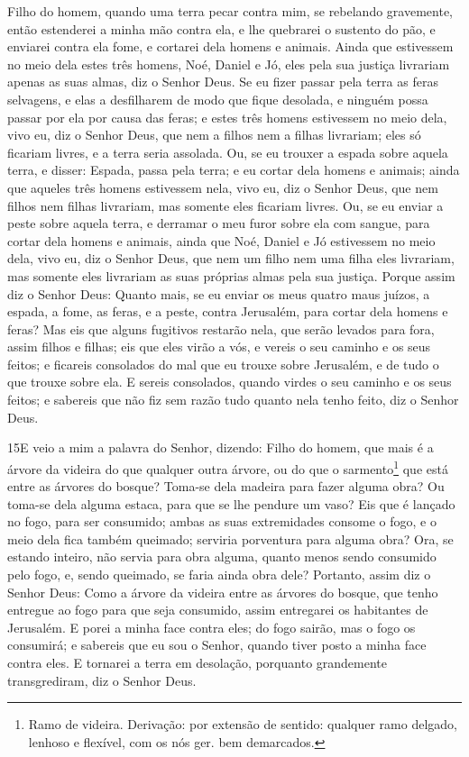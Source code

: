 Filho do homem, quando uma terra pecar contra mim, se rebelando
gravemente, então estenderei a minha mão contra ela, e lhe quebrarei
o sustento do pão, e enviarei contra ela fome, e cortarei dela
homens e animais. Ainda que estivessem no meio dela estes
três homens, Noé, Daniel e Jó, eles pela sua justiça livrariam
apenas as suas almas, diz o Senhor Deus. Se eu fizer passar
pela terra as feras selvagens, e elas a desfilharem de modo que
fique desolada, e ninguém possa passar por ela por causa das feras;
e estes três homens estivessem no meio dela, vivo eu, diz o
Senhor Deus, que nem a filhos nem a filhas livrariam; eles só
ficariam livres, e a terra seria assolada. Ou, se eu trouxer
a espada sobre aquela terra, e disser: Espada, passa pela terra; e
eu cortar dela homens e animais; ainda que aqueles três
homens estivessem nela, vivo eu, diz o Senhor Deus, que nem filhos
nem filhas livrariam, mas somente eles ficariam livres. Ou,
se eu enviar a peste sobre aquela terra, e derramar o meu furor
sobre ela com sangue, para cortar dela homens e animais,
ainda que Noé, Daniel e Jó estivessem no meio dela, vivo eu,
diz o Senhor Deus, que nem um filho nem uma filha eles livrariam,
mas somente eles livrariam as suas próprias almas pela sua justiça.
Porque assim diz o Senhor Deus: Quanto mais, se eu enviar os
meus quatro maus juízos, a espada, a fome, as feras, e a peste,
contra Jerusalém, para cortar dela homens e feras? Mas eis
que alguns fugitivos restarão nela, que serão levados para fora,
assim filhos e filhas; eis que eles virão a vós, e vereis o seu
caminho e os seus feitos; e ficareis consolados do mal que eu trouxe
sobre Jerusalém, e de tudo o que trouxe sobre ela. E sereis
consolados, quando virdes o seu caminho e os seus feitos; e sabereis
que não fiz sem razão tudo quanto nela tenho feito, diz o Senhor
Deus.

\medskip

\lettrine{15} E veio a mim a palavra do Senhor, dizendo:
Filho do homem, que mais é a árvore da videira do que qualquer
outra árvore, ou do que o sarmento\footnote{Ramo de videira.
Derivação: por extensão de sentido: qualquer ramo delgado, lenhoso e
flexível, com os nós ger. bem demarcados.} que está entre as árvores
do bosque? Toma-se dela madeira para fazer alguma obra? Ou
toma-se dela alguma estaca, para que se lhe pendure um vaso? Eis
que é lançado no fogo, para ser consumido; ambas as suas
extremidades consome o fogo, e o meio dela fica também queimado;
serviria porventura para alguma obra? Ora, se estando inteiro,
não servia para obra alguma, quanto menos sendo consumido pelo fogo,
e, sendo queimado, se faria ainda obra dele? Portanto, assim diz
o Senhor Deus: Como a árvore da videira entre as árvores do bosque,
que tenho entregue ao fogo para que seja consumido, assim entregarei
os habitantes de Jerusalém. E porei a minha face contra eles; do
fogo sairão, mas o fogo os consumirá; e sabereis que eu sou o
Senhor, quando tiver posto a minha face contra eles. E tornarei
a terra em desolação, porquanto grandemente transgrediram, diz o
Senhor Deus.

